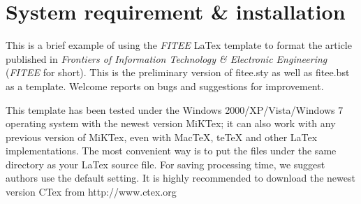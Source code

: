 \documentclass[twoside,twocolumn]{article}
\begin{document}


\articleType{}


\maketitle

\section{System requirement \& installation}\label{sec:introduction}
  This is a brief example of using the \emph{FITEE} LaTex template to format the article published in \emph{Frontiers of Information Technology {\sf \slshape \&} Electronic Engineering} (\emph{FITEE} for short). This is the preliminary version of fitee.sty as well as fitee.bst as a template. Welcome reports on bugs and suggestions for improvement.



This template has been tested under the Windows 2000/XP/Vista/Windows 7 operating system with the newest version MiKTex; it can also work with any previous version of MiKTex, even with MacTeX, teTeX and other LaTex implementations. The most convenient way is to put the files under the same directory as your LaTex source file. For saving processing time, we suggest authors use the default setting. It is highly recommended to download the newest version CTex from http://www.ctex.org
\end{document}
